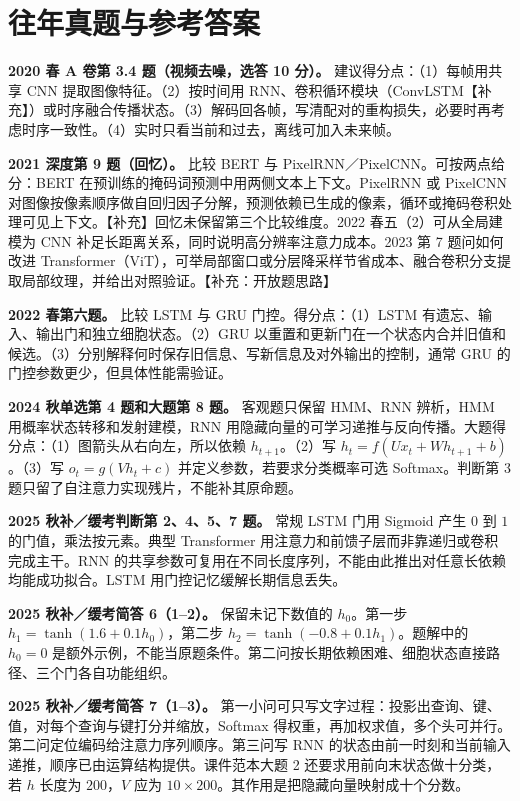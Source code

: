 \documentclass[UTF8,a4paper,zihao=-4,fontset=fandol]{ctexrep}
\begin{document}
\section{往年真题与参考答案}

\textbf{2020 春 A 卷第 3.4 题（视频去噪，选答 10 分）。} 建议得分点：（1）每帧用共享 CNN 提取图像特征。（2）按时间用 RNN、卷积循环模块（ConvLSTM【补充】）或时序融合传播状态。（3）解码回各帧，写清配对的重构损失，必要时再考虑时序一致性。（4）实时只看当前和过去，离线可加入未来帧。

\textbf{2021 深度第 9 题（回忆）。} 比较 BERT 与 PixelRNN／PixelCNN。可按两点给分：BERT 在预训练的掩码词预测中用两侧文本上下文。PixelRNN 或 PixelCNN 对图像按像素顺序做自回归因子分解，预测依赖已生成的像素，循环或掩码卷积处理可见上下文。【补充】回忆未保留第三个比较维度。2022 春五（2）可从全局建模为 CNN 补足长距离关系，同时说明高分辨率注意力成本。2023 第 7 题问如何改进 Transformer（ViT），可举局部窗口或分层降采样节省成本、融合卷积分支提取局部纹理，并给出对照验证。【补充：开放题思路】

\textbf{2022 春第六题。} 比较 LSTM 与 GRU 门控。得分点：（1）LSTM 有遗忘、输入、输出门和独立细胞状态。（2）GRU 以重置和更新门在一个状态内合并旧值和候选。（3）分别解释何时保存旧信息、写新信息及对外输出的控制，通常 GRU 的门控参数更少，但具体性能需验证。

\textbf{2024 秋单选第 4 题和大题第 8 题。} 客观题只保留 HMM、RNN 辨析，HMM 用概率状态转移和发射建模，RNN 用隐藏向量的可学习递推与反向传播。大题得分点：（1）图箭头从右向左，所以依赖 $h_{t+1}$。（2）写 $h_t=f(Ux_t+Wh_{t+1}+b)$。（3）写 $o_t=g(Vh_t+c)$ 并定义参数，若要求分类概率可选 Softmax。判断第 3 题只留了自注意力实现残片，不能补其原命题。

\textbf{2025 秋补／缓考判断第 2、4、5、7 题。} 常规 LSTM 门用 Sigmoid 产生 $0$ 到 $1$ 的门值，乘法按元素。典型 Transformer 用注意力和前馈子层而非靠递归或卷积完成主干。RNN 的共享参数可复用在不同长度序列，不能由此推出对任意长依赖均能成功拟合。LSTM 用门控记忆缓解长期信息丢失。

\textbf{2025 秋补／缓考简答 6（1--2）。} 保留未记下数值的 $h_0$。第一步 $h_1=\tanh(1.6+0.1h_0)$，第二步 $h_2=\tanh(-0.8+0.1h_1)$。题解中的 $h_0=0$ 是额外示例，不能当原题条件。第二问按长期依赖困难、细胞状态直接路径、三个门各自功能组织。

\textbf{2025 秋补／缓考简答 7（1--3）。} 第一小问可只写文字过程：投影出查询、键、值，对每个查询与键打分并缩放，Softmax 得权重，再加权求值，多个头可并行。第二问定位编码给注意力序列顺序。第三问写 RNN 的状态由前一时刻和当前输入递推，顺序已由运算结构提供。课件范本大题 2 还要求用前向末状态做十分类，若 $h$ 长度为 $200$，$V$ 应为 $10\times200$。其作用是把隐藏向量映射成十个分数。
\end{document}

